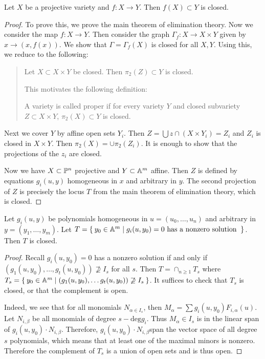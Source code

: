 \documentclass[twoside, 10pt]{article}
\begin{document}
    \begin{thm}
        Let $X$ be a projective variety and $f:X \to Y$. Then $f(X) \subset Y$ is closed.
        \begin{proof}
            To prove this, we prove the main theorem of elimination theory. Now we consider the map $f:X \to Y$. Then consider the graph $\Gamma_f: X \to X \times Y$ given by $x \to (x,f(x))$. We show that $\Gamma = \Gamma_f(X)$ is closed for all $X,Y$. Using this, we reduce to the following:
            \begin{quote}
                \begin{thm}
                    Let $X \subset X \times Y$ be closed. Then $\pi_2(Z) \subset Y$ is closed.
                \end{thm}
                This motivates the following definition:
                \begin{defn}
                    A variety is called proper if for every variety $Y$ and closed subvariety $Z \subset X \times Y$, $\pi_2(X) \subset Y$ is closed.
                \end{defn}
            \end{quote}
            Next we cover $Y$ by affine open sets $Y_i$. Then $Z = \bigcup z \cap (X \times Y_i) = Z_i$ and $Z_i$ is closed in $X \times Y$. Then $\pi_2(X) = \cup \pi_2(Z_i)$. It is enough to show that the projections of the $z_i$ are closed.

            Now we have $X \subset \P^n$ projective and $Y \subset \A^m$ affine. Then $Z$ is defined by equations $g_i(u,y)$ homogeneous in $x$ and arbitrary in $y$. The second projection of $Z$ is precisely the locus $T$ from the main theorem of elimination theory, which is closed.
        \end{proof}
    \end{thm}

    \begin{thm}
        Let $g_i(u,y)$ be polynomials homogeneous in $u = (u_0, \ldots, u_n)$ and arbitrary in $y = (y_1, \ldots, y_m)$. Let $T = \Set{y_0 \in \A^m | g_i(u,y_0)=0 \text{ has a nonzero solution }}$. Then $T$ is closed.
        \begin{proof}
            Recall $g_i(u, y_0)=0$ has a nonzero solution if and only if $(g_1(u,y_0), \ldots, g_t(u,y_0)) \not \supseteq I_s$ for all $s$. Then $T = \cap_{n \geq 1} T_s$ where $T_s = \Set{y_0 \in \A^m | (g_1(u,y_0), \ldots g_t(u,y_0)) \not\supseteq I_s}$. It suffices to check that $T_s$ is closed, or that the complement is open.

            Indeed, we see that for all monomials $N_{\alpha \in I_s}$, then $M_{\alpha} = \sum g_i(u,y_0)F_{i,\alpha}(u)$. Let $N_{i,\beta}$ be all monomials of degree $s - \mathrm{deg}g_i$. Thus $M_{\alpha}\in I_s$ is in the linear span of $g_i(u,y_0) \cdot N_{i,\beta}$. Therefore, $g_i(u,y_0) \cdot N_{i,\beta}$span the vector space of all degree $s$ polynomials, which means that at least one of the maximal minors is nonzero. Therefore the complement of $T_s$ is a union of open sets and is thus open.
        \end{proof}
    \end{thm}
\end{document}
